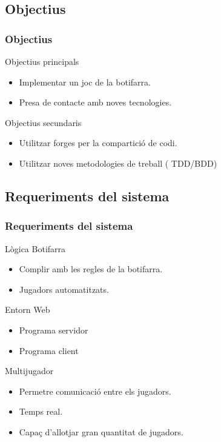 \documentclass[notitlepage]{beamer}
\begin{document}
\subsection{Objectius}
\begin{frame}
\frametitle{Objectius}
\begin{block}{Objectius principals}
\begin{itemize}
    \item{Implementar un joc de la botifarra.}
    \item{Presa de contacte amb noves tecnologies.}  
\end{itemize}
\end{block}

\begin{block}{Objectius secundaris}
\begin{itemize}
    \item{Utilitzar forges per la compartició de codi.}
    \item{Utilitzar noves metodologies de treball ( TDD/BDD)}  
\end{itemize}
\end{block}

\end{frame}


\subsection{Requeriments del sistema}
\begin{frame}
\frametitle{Requeriments del sistema}
\begin{block}{Lògica Botifarra}
\begin{itemize}
    \item{Complir amb les regles de la botifarra.}
    \item{Jugadors automatitzats.}
\end{itemize}
\end{block}

\begin{block}{Entorn Web}
\begin{itemize}
    \item{Programa servidor}
    \item{Programa client}
\end{itemize}
\end{block}

\begin{block}{Multijugador}
\begin{itemize}
    \item{Permetre comunicació entre els jugadors.}
    \item{Temps real.}
    \item{Capaç d'allotjar gran quantitat de jugadors.}
\end{itemize}
\end{block}
\end{frame}
\end{document}
